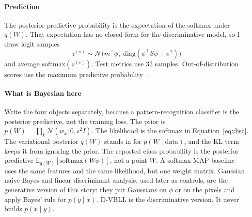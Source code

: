 \documentclass[11pt,a4paper]{article}
\begin{document}
\paragraph{Prediction}
The posterior predictive probability is the expectation of the softmax under $q(W)$.
That expectation has no closed form for the discriminative model, so I draw logit samples
\begin{equation}
z^{(s)}\sim\mathcal{N}\!\big(m^{\top}\phi,\;\mathrm{diag}(\phi^{\top}S\phi+\sigma^{2})\big)
\label{eq:pred}
\end{equation}
and average $\mathrm{softmax}(z^{(s)})$.
Test metrics use 32 samples.
Out-of-distribution scores use the maximum predictive probability~\cite{hendrycks2017baseline}.

\paragraph{What is Bayesian here}
Write the four objects separately, because a pattern-recognition classifier is the posterior predictive, not the training loss.
The prior is $p(W)=\prod_k\mathcal{N}(w_k;0,s^{2}I)$.
The likelihood is the softmax in Equation~\eqref{eq:disc}.
The variational posterior $q(W)$ stands in for $p(W\mid\mathrm{data})$, and the KL term keeps it from ignoring the prior.
The reported class probability is the posterior predictive $\mathbb{E}_{q(W)}[\mathrm{softmax}(W\phi)]$, not a point $W$.
A softmax MAP baseline uses the same features and the same likelihood, but one weight matrix.
Gaussian naive Bayes and linear discriminant analysis, used later as controls, are the generative version of this story: they put Gaussians on $\phi$ or on the pixels and apply Bayes' rule for $p(y\mid x)$.
D-VBLL is the discriminative version. It never builds $p(x\mid y)$.
\end{document}
